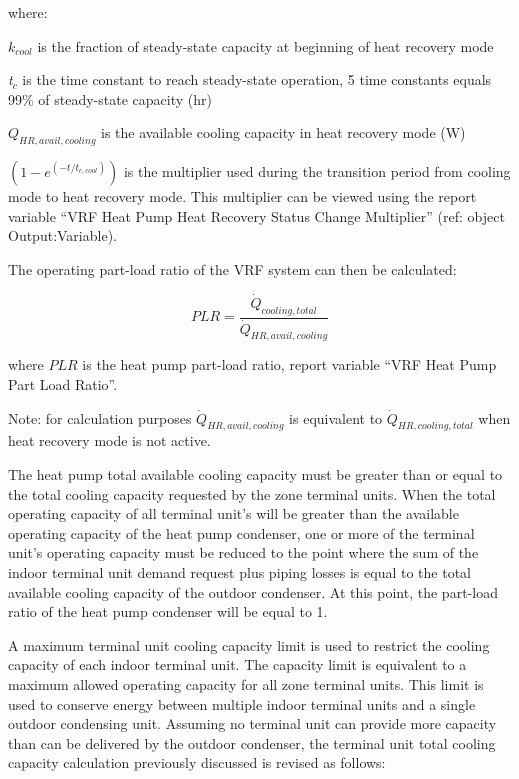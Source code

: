 where:

\(k_{cool}\) is the fraction of steady-state capacity at beginning of heat recovery mode

\emph{t}\(_c\) is the time constant to reach steady-state operation, 5 time constants equals 99\% of steady-state capacity (hr)

\(Q_{HR,avail,cooling}\) is the available cooling capacity in heat recovery mode (W)

\(\left( 1 - e^{\left( -t / t_{c,cool} \right)} \right)\) is the multiplier used during the transition period from cooling mode to heat recovery mode. This multiplier can be viewed using the report variable ``VRF Heat Pump Heat Recovery Status Change Multiplier'' (ref: object Output:Variable).

The operating part-load ratio of the VRF system can then be calculated:

\begin{equation}
  PLR = \frac{\dot{Q}_{cooling,total}}{\dot{Q}_{HR,avail,cooling}}
\end{equation}

where \(PLR\) is the heat pump part-load ratio, report variable ``VRF Heat Pump Part Load Ratio''.

Note: for calculation purposes \(\dot{Q}_{HR,avail,cooling}\) is equivalent to \(\dot{Q}_{HR,cooling,total}\) when heat recovery mode is not active.

The heat pump total available cooling capacity must be greater than or equal to the total cooling capacity requested by the zone terminal units. When the total operating capacity of all terminal unit's will be greater than the available operating capacity of the heat pump condenser, one or more of the terminal unit's operating capacity must be reduced to the point where the sum of the indoor terminal unit demand request plus piping losses is equal to the total available cooling capacity of the outdoor condenser. At this point, the part-load ratio of the heat pump condenser will be equal to 1.

A maximum terminal unit cooling capacity limit is used to restrict the cooling capacity of each indoor terminal unit. The capacity limit is equivalent to a maximum allowed operating capacity for all zone terminal units. This limit is used to conserve energy between multiple indoor terminal units and a single outdoor condensing unit. Assuming no terminal unit can provide more capacity than can be delivered by the outdoor condenser, the terminal unit total cooling capacity calculation previously discussed is revised as follows:

